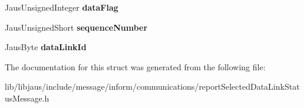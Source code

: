 \begin{DoxyCompactItemize}
\item 
\hypertarget{struct_report_selected_data_link_status_message_struct_a9fff10567a85e10fe13306ded4947d2d}{\-Jaus\-Unsigned\-Integer {\bfseries data\-Flag}}\label{struct_report_selected_data_link_status_message_struct_a9fff10567a85e10fe13306ded4947d2d}

\item 
\hypertarget{struct_report_selected_data_link_status_message_struct_a102b11487aa8331a721193147d546f85}{\-Jaus\-Unsigned\-Short {\bfseries sequence\-Number}}\label{struct_report_selected_data_link_status_message_struct_a102b11487aa8331a721193147d546f85}

\item 
\hypertarget{struct_report_selected_data_link_status_message_struct_a665d7b89380f37b4e5f42a799f649b51}{\-Jaus\-Byte {\bfseries data\-Link\-Id}}\label{struct_report_selected_data_link_status_message_struct_a665d7b89380f37b4e5f42a799f649b51}

\end{DoxyCompactItemize}


\-The documentation for this struct was generated from the following file\-:\begin{DoxyCompactItemize}
\item 
lib/libjaus/include/message/inform/communications/report\-Selected\-Data\-Link\-Status\-Message.\-h\end{DoxyCompactItemize}
